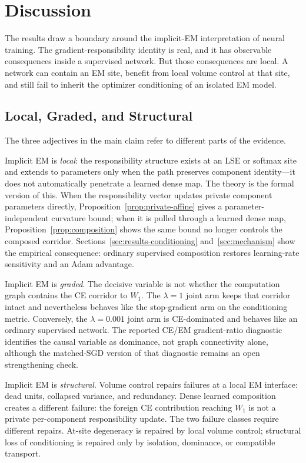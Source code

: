 \section{Discussion}
\label{sec:discussion}
The results draw a boundary around the implicit-EM interpretation of neural
training. The gradient-responsibility identity is real, and it has observable
consequences inside a supervised network. But those consequences are local. A
network can contain an EM site, benefit from local volume control at that
site, and still fail to inherit the optimizer conditioning of an isolated EM
model.

\subsection{Local, Graded, and Structural}
The three adjectives in the main claim refer to different parts of the
evidence.

Implicit EM is \emph{local}: the responsibility structure exists at an LSE or
softmax site and extends to parameters only when the path preserves component
identity---it does not automatically penetrate a learned dense map. The theory
is the formal version of this. When the responsibility vector updates private
component parameters directly, Proposition~\ref{prop:private-affine} gives a
parameter-independent curvature bound; when it is pulled through a learned
dense map, Proposition~\ref{prop:composition} shows the same bound no longer
controls the composed corridor. Sections~\ref{sec:results-conditioning}
and~\ref{sec:mechanism} show the empirical consequence: ordinary supervised
composition restores learning-rate sensitivity and an Adam advantage.

Implicit EM is \emph{graded}. The decisive variable is not whether the
computation graph contains the CE corridor to $W_1$. The $\lambda=1$ joint arm
keeps that corridor intact and nevertheless behaves like the stop-gradient arm
on the conditioning metric. Conversely, the $\lambda=0.001$ joint arm is
CE-dominated and behaves like an ordinary supervised network. The reported
CE/EM gradient-ratio diagnostic identifies the causal variable as dominance,
not graph connectivity alone, although the matched-SGD version of that
diagnostic remains an open strengthening check.

Implicit EM is \emph{structural}. Volume control repairs failures at a local
EM interface: dead units, collapsed variance, and redundancy. Dense learned
composition creates a different failure: the foreign CE contribution reaching
$W_1$ is not a private per-component responsibility update. The two failure
classes require different repairs. At-site degeneracy is repaired by local
volume control; structural loss of conditioning is repaired only by isolation,
dominance, or compatible transport.

